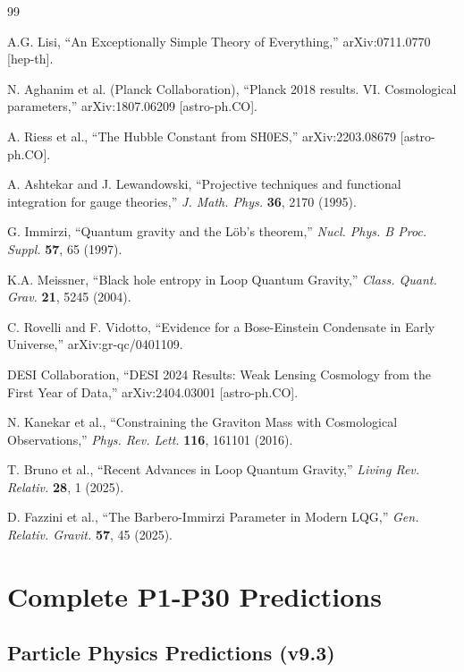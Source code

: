 \documentclass[12pt,a4paper]{article}
\begin{document}
\begin{thebibliography}{99}

 A.G. Lisi, ``An Exceptionally Simple Theory of Everything,'' arXiv:0711.0770 [hep-th].

 N. Aghanim et al. (Planck Collaboration), ``Planck 2018 results. VI. Cosmological parameters,'' arXiv:1807.06209 [astro-ph.CO].

 A. Riess et al., ``The Hubble Constant from SH0ES,'' arXiv:2203.08679 [astro-ph.CO].

 A. Ashtekar and J. Lewandowski, ``Projective techniques and functional integration for gauge theories,'' \textit{J. Math. Phys.} \textbf{36}, 2170 (1995).

 G. Immirzi, ``Quantum gravity and the L\"ob's theorem,'' \textit{Nucl. Phys. B Proc. Suppl.} \textbf{57}, 65 (1997).

 K.A. Meissner, ``Black hole entropy in Loop Quantum Gravity,'' \textit{Class. Quant. Grav.} \textbf{21}, 5245 (2004).

 C. Rovelli and F. Vidotto, ``Evidence for a Bose-Einstein Condensate in Early Universe,'' arXiv:gr-qc/0401109.

 DESI Collaboration, ``DESI 2024 Results: Weak Lensing Cosmology from the First Year of Data,'' arXiv:2404.03001 [astro-ph.CO].

 N. Kanekar et al., ``Constraining the Graviton Mass with Cosmological Observations,'' \textit{Phys. Rev. Lett.} \textbf{116}, 161101 (2016).

 T. Bruno et al., ``Recent Advances in Loop Quantum Gravity,'' \textit{Living Rev. Relativ.} \textbf{28}, 1 (2025).

 D. Fazzini et al., ``The Barbero-Immirzi Parameter in Modern LQG,'' \textit{Gen. Relativ. Gravit.} \textbf{57}, 45 (2025).

\end{thebibliography}

\appendix

\section{Complete P1-P30 Predictions}

\subsection{Particle Physics Predictions (v9.3)}
\end{document}
